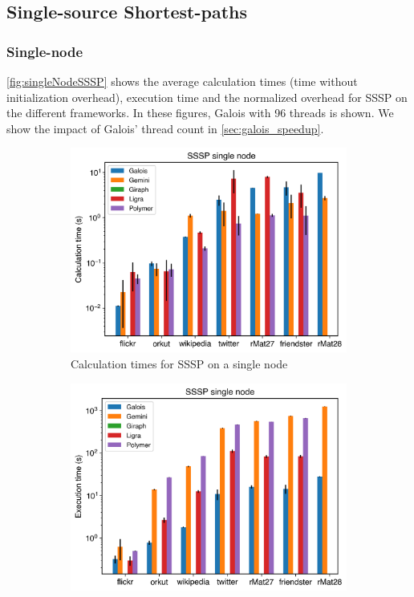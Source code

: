 

\subsection{Single-source Shortest-paths}

\subsubsection{Single-node}
\autoref{fig:singleNodeSSSP} shows the average calculation times (time without initialization overhead), execution time and the normalized overhead for SSSP on the different frameworks. In these figures, Galois with 96 threads is shown. We show the impact of Galois' thread count in \autoref{sec:galois_speedup}.
\begin{figure}[ht!]
	\begin{subfigure}{0.3\textwidth}
		\includegraphics[width=\linewidth]{../../plots/singleNodeSSSP_calcTime.png}
		\caption{Calculation times for SSSP on a single node}
		\label{fig:singleNodeSSSP_calc}
	\end{subfigure}
	\hfil
	\begin{subfigure}{0.3\textwidth}
		\includegraphics[width=\linewidth]{../../plots/singleNodeSSSP_execTime.png}

\end{subfigure}
\end{figure}
